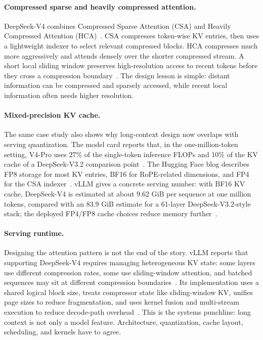 \paragraph{Compressed sparse and heavily compressed attention.} DeepSeek-V4 combines Compressed Sparse Attention (CSA) and Heavily Compressed Attention (HCA)~\cite{deepseek2026v4hf,deepseek2026v4hfblog}. CSA compresses token-wise KV entries, then uses a lightweight indexer to select relevant compressed blocks. HCA compresses much more aggressively and attends densely over the shorter compressed stream. A short local sliding window preserves high-resolution access to recent tokens before they cross a compression boundary~\cite{vllm2026deepseekv4}. The design lesson is simple: distant information can be compressed and sparsely accessed, while recent local information often needs higher resolution.

\paragraph{Mixed-precision KV cache.} The same case study also shows why long-context design now overlaps with serving quantization. The model card reports that, in the one-million-token setting, V4-Pro uses 27\% of the single-token inference FLOPs and 10\% of the KV cache of a DeepSeek-V3.2 comparison point~\cite{deepseek2026v4hf}. The Hugging Face blog describes FP8 storage for most KV entries, BF16 for RoPE-related dimensions, and FP4 for the CSA indexer~\cite{deepseek2026v4hfblog}. vLLM gives a concrete serving number: with BF16 KV cache, DeepSeek-V4 is estimated at about 9.62 GiB per sequence at one million tokens, compared with an 83.9 GiB estimate for a 61-layer DeepSeek-V3.2-style stack; the deployed FP4/FP8 cache choices reduce memory further~\cite{vllm2026deepseekv4}.

\paragraph{Serving runtime.} Designing the attention pattern is not the end of the story. vLLM reports that supporting DeepSeek-V4 requires managing heterogeneous KV state: some layers use different compression rates, some use sliding-window attention, and batched sequences may sit at different compression boundaries~\cite{vllm2026deepseekv4}. Its implementation uses a shared logical block size, treats compressor state like sliding-window KV, unifies page sizes to reduce fragmentation, and uses kernel fusion and multi-stream execution to reduce decode-path overhead~\cite{vllm2026deepseekv4}. This is the systems punchline: long context is not only a model feature. Architecture, quantization, cache layout, scheduling, and kernels have to agree.

